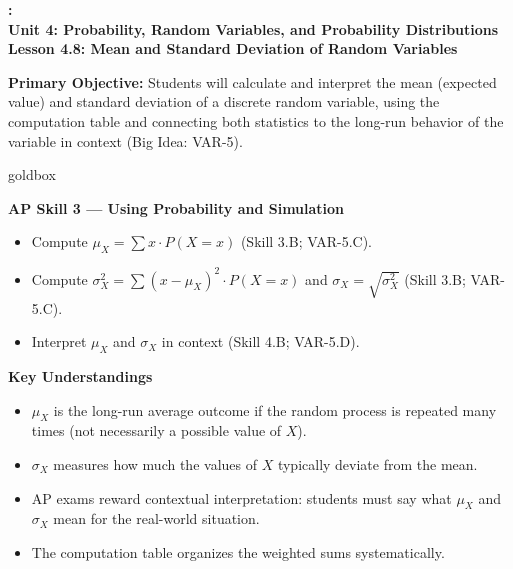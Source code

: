 \documentclass[10pt]{article}
\newcommand{\UnitNumberName}{Unit 4: Probability, Random Variables, and Probability Distributions \quad}
\newcommand{\LessonNumberName}{Lesson 4.8: Mean and Standard Deviation of Random Variables}
\begin{document}
\begin{center}
    {\Large\bfseries \CourseName: \SchoolYear \\
    {\small\bfseries \UnitNumberName \LessonNumberName}}
\end{center}

\begin{tcolorbox}[colback=sky, colframe=navy, boxrule=0.9pt, arc=2mm,
    left=2mm, right=2mm, top=1.5mm, bottom=1.5mm]
    \textbf{Primary Objective:} Students will calculate and interpret the mean (expected value)
    and standard deviation of a discrete random variable, using the computation table and
    connecting both statistics to the long-run behavior of the variable in context
    (Big Idea: VAR-5).
\end{tcolorbox}

\renewcommand{\arraystretch}{1.6}
\begin{skillbox}{goldbox}
\begin{minipage}[t]{0.48\linewidth}
    \textbf{AP Skill 3 --- Using Probability and Simulation}
    \begin{itemize}
        \item Compute $\mu_X = \sum x \cdot P(X=x)$ (Skill 3.B; VAR-5.C).
        \item Compute $\sigma^2_X = \sum (x-\mu_X)^2 \cdot P(X=x)$ and
              $\sigma_X = \sqrt{\sigma^2_X}$ (Skill 3.B; VAR-5.C).
        \item Interpret $\mu_X$ and $\sigma_X$ in context (Skill 4.B; VAR-5.D).
    \end{itemize}
\end{minipage}
\hfill
\begin{minipage}[t]{0.48\linewidth}
    \textbf{Key Understandings}
    \begin{itemize}
        \item $\mu_X$ is the long-run average outcome if the random process is repeated
              many times (not necessarily a possible value of $X$).
        \item $\sigma_X$ measures how much the values of $X$ typically deviate from
              the mean.
        \item AP exams reward contextual interpretation: students must say what
              $\mu_X$ and $\sigma_X$ mean for the real-world situation.
        \item The computation table organizes the weighted sums systematically.
    \end{itemize}
\end{minipage}
\end{skillbox}
\end{document}
